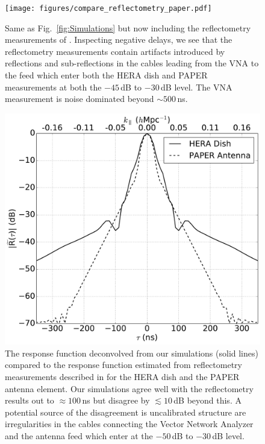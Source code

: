 \documentclass[twocolumn]{emulateapj}
\begin{document}
\begin{figure}
\texttt{[image: figures/compare\_reflectometry\_paper.pdf]}
\caption{Same as Fig.~\ref{fig:Simulations} but now including 
 the reflectometry measurements of \citep{Patra:2015}. Inspecting negative delays, we see that the reflectometry measurements contain artifacts introduced by reflections and sub-reflections in the cables leading from the VNA to the feed which enter both the HERA dish and PAPER measurements at both the $-45$\,dB to $-30$\,dB level. The VNA measurement is noise dominated beyond $\sim 500$\,ns.}\label{fig:Reflectometry}
\end{figure}

\begin{figure}[h!]
\includegraphics[width=.5\textwidth]{figures/compare_kernels_paper.pdf}
\caption{The response function deconvolved from our simulations (solid lines) compared to the response function estimated from reflectometry measurements described in \citep{Patra:2015} for the HERA dish and the PAPER antenna element. Our simulations agree well with the reflectometry results out to $\approx 100$\,ns but disagree by $\lesssim10$\,dB beyond this. A potential source of the disagreement is uncalibrated structure are irregularities in the cables connecting the Vector Network Analyzer and the antenna feed which enter at the $-50$\,dB to $-30$\,dB level.}
\label{fig:Kernels}
\end{figure}
\end{document}
